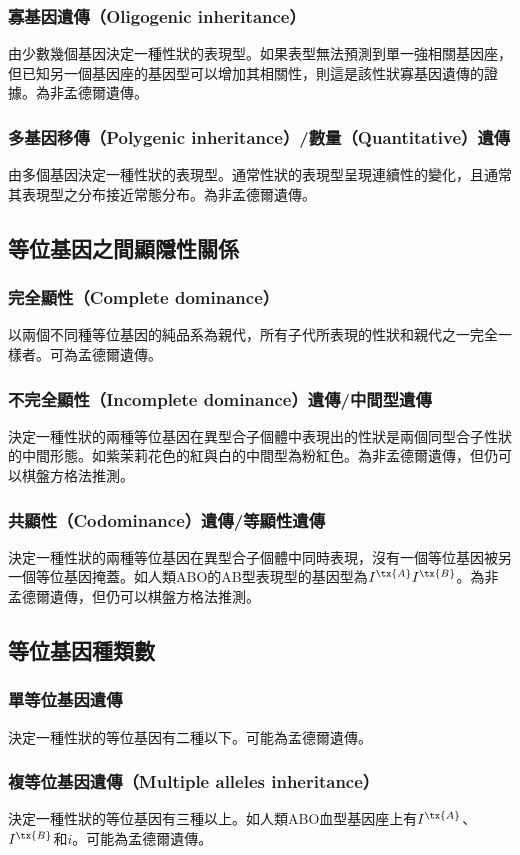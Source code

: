\documentclass[a4paper,12pt]{report}
\begin{document}
\subsubsection{寡基因遺傳（Oligogenic inheritance）}
由少數幾個基因決定一種性狀的表現型。如果表型無法預測到單一強相關基因座，但已知另一個基因座的基因型可以增加其相關性，則這是該性狀寡基因遺傳的證據。為非孟德爾遺傳。
\subsubsection{多基因移傳（Polygenic inheritance）/數量（Quantitative）遺傳}
由多個基因決定一種性狀的表現型。通常性狀的表現型呈現連續性的變化，且通常其表現型之分布接近常態分布。為非孟德爾遺傳。
\subsection{等位基因之間顯隱性關係}
\subsubsection{完全顯性（Complete dominance）}
以兩個不同種等位基因的純品系為親代，所有子代所表現的性狀和親代之一完全一樣者。可為孟德爾遺傳。
\subsubsection{不完全顯性（Incomplete dominance）遺傳/中間型遺傳}
決定一種性狀的兩種等位基因在異型合子個體中表現出的性狀是兩個同型合子性狀的中間形態。如紫茉莉花色的紅與白的中間型為粉紅色。為非孟德爾遺傳，但仍可以棋盤方格法推測。
\subsubsection{共顯性（Codominance）遺傳/等顯性遺傳}
決定一種性狀的兩種等位基因在異型合子個體中同時表現，沒有一個等位基因被另一個等位基因掩蓋。如人類ABO的AB型表現型的基因型為$I^{\tx{A}}I^{\tx{B}}$。為非孟德爾遺傳，但仍可以棋盤方格法推測。
\subsection{等位基因種類數}
\subsubsection{單等位基因遺傳}
決定一種性狀的等位基因有二種以下。可能為孟德爾遺傳。
\subsubsection{複等位基因遺傳（Multiple alleles inheritance）}
決定一種性狀的等位基因有三種以上。如人類ABO血型基因座上有$I^{\tx{A}}$、$I^{\tx{B}}$和$i$。可能為孟德爾遺傳。
\end{document}
